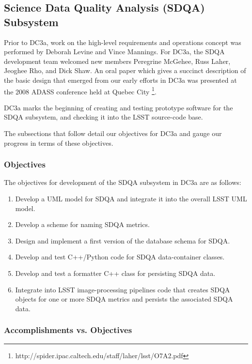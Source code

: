 
\subsection{\label{sdqasubsection}Science Data Quality Analysis (SDQA) Subsystem}

Prior to DC3a, work on the high-level requirements and operations concept was performed 
by Deborah Levine and Vince Mannings.  For DC3a, the SDQA development team welcomed new
members Peregrine McGehee, Russ Laher, Jeoghee Rho, and Dick Shaw.  An oral paper which
gives a succinct description of the basic design that emerged from our early efforts in 
DC3a was presented at the 2008 ADASS conference held at Quebec City \citep{laher08}\footnote{http://spider.ipac.caltech.edu/staff/laher/lsst/O7A2.pdf}.

DC3a marks the beginning of creating and testing prototype software for the SDQA subsystem, and checking it into the LSST source-code base.

The subsections that follow detail our objectives for DC3a and gauge our progress in
terms of these objectives.


\subsubsection{Objectives}

   The objectives for development of the SDQA subsystem in DC3a are as follows:

\begin{enumerate} 
\item{Develop a UML model for SDQA and integrate it into the overall LSST UML model.} 
\item{Develop a scheme for naming SDQA metrics. }
\item{Design and implement a first version of the database schema for SDQA.}
\item{Develop and test C++/Python code for SDQA data-container classes.}
\item{Develop and test a formatter C++ class for persisting SDQA data.}
\item{Integrate into LSST image-processing pipelines code that creates SDQA objects
for one or more SDQA metrics and persists the associated SDQA data.}
\end{enumerate}

\subsubsection{Accomplishments vs. Objectives}

